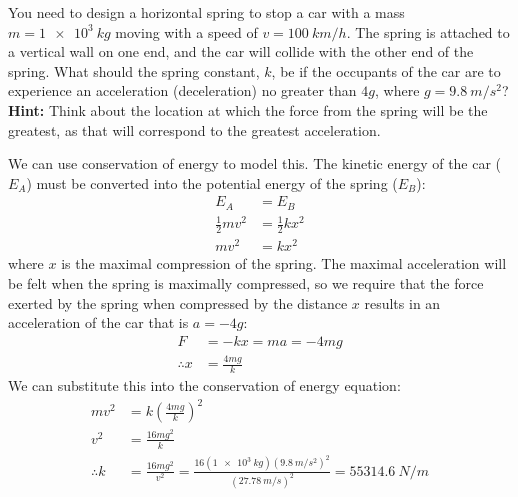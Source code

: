 \question You need to design a horizontal spring to stop a car with a mass $m=\SI{1e3}{kg}$ moving with a speed of $v=\SI{100}{km/h}$. The spring is attached to a vertical wall on one end, and the car will collide with the other end of the spring. What should the spring constant, $k$, be if the occupants of the car are to experience an acceleration (deceleration) no greater than $4g$, where $g=\SI{9.8}{m/s^2}$? \textbf{Hint:} Think about the location at which the force from the spring will be the greatest, as that will correspond to the greatest acceleration.
\begin{solution}
We can use conservation of energy to model this. The kinetic energy of the car ($E_A$) must be converted into the potential energy of the spring ($E_B$):
\begin{align*}
E_A&=E_B\\
\frac{1}{2}mv^2&=\frac{1}{2}kx^2\\
mv^2&=kx^2
\end{align*}
where $x$ is the maximal compression of the spring. The maximal acceleration will be felt when the spring is maximally compressed, so we require that the force exerted by the spring when compressed by the distance $x$ results in an acceleration of the car that is $a=-4g$:
\begin{align*}
F&=-kx=ma=-4mg\\
\therefore x&=\frac{4mg}{k}
\end{align*}
We can substitute this into the conservation of energy equation:
\begin{align*}
mv^2&=k\left(\frac{4mg}{k}\right)^2\\
v^2&=\frac{16mg^2}{k}\\
\therefore k&=\frac{16mg^2}{v^2}=\frac{16(\SI{1e3}{kg})(\SI{9.8}{m/s^2})^2}{(\SI{27.78}{m/s})^2}=\SI{55314.6}{N/m}
\end{align*}
\end{solution}

